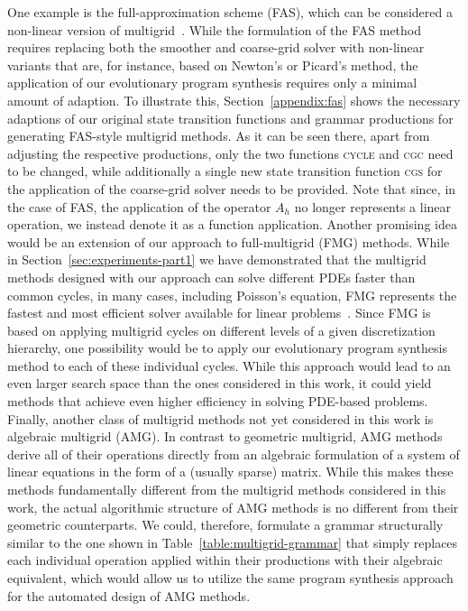 One example is the full-approximation scheme (FAS), which can be considered a non-linear version of multigrid~\cite{trottenberg2000multigrid,briggs2000multigrid}.
While the formulation of the FAS method requires replacing both the smoother and coarse-grid solver with non-linear variants that are, for instance, based on Newton's or Picard's method, the application of our evolutionary program synthesis requires only a minimal amount of adaption.
To illustrate this, Section~\ref{appendix:fas} shows the necessary adaptions of our original state transition functions and grammar productions for generating FAS-style multigrid methods. 
As it can be seen there, apart from adjusting the respective productions, only the two functions \textsc{cycle} and \textsc{cgc} need to be changed, while additionally a single new state transition function \textsc{cgs} for the application of the coarse-grid solver needs to be provided. 
Note that since, in the case of FAS, the application of the operator $A_h$ no longer represents a linear operation, we instead denote it as a function application.
Another promising idea would be an extension of our approach to full-multigrid (FMG) methods.
While in Section~\ref{sec:experiments-part1} we have demonstrated that the multigrid methods designed with our approach can solve different PDEs faster than common cycles, in many cases, including Poisson's equation, FMG represents the fastest and most efficient solver available for linear problems~\cite{trottenberg2000multigrid}.
Since FMG is based on applying multigrid cycles on different levels of a given discretization hierarchy, one possibility would be to apply our evolutionary program synthesis method to each of these individual cycles.
While this approach would lead to an even larger search space than the ones considered in this work, it could yield methods that achieve even higher efficiency in solving PDE-based problems.
Finally, another class of multigrid methods not yet considered in this work is algebraic multigrid (AMG).
In contrast to geometric multigrid, AMG methods derive all of their operations directly from an algebraic formulation of a system of linear equations in the form of a (usually sparse) matrix.
While this makes these methods fundamentally different from the multigrid methods considered in this work, the actual algorithmic structure of AMG methods is no different from their geometric counterparts.
We could, therefore, formulate a grammar structurally similar to the one shown in Table~\ref{table:multigrid-grammar} that simply replaces each individual operation applied within their productions with their algebraic equivalent, which would allow us to utilize the same program synthesis approach for the automated design of AMG methods.
